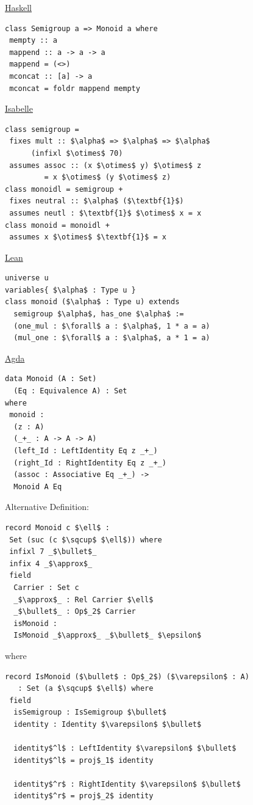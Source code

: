 \documentclass{beamer}
\begin{document}
\begin{frame}[fragile,t]
\begin{multicols}{3}
\begin{minipage}{2.9in}
\underline{Haskell}
\begin{lstlisting}
class Semigroup a => Monoid a where 
 mempty :: a 
 mappend :: a -> a -> a 
 mappend = (<>) 
 mconcat :: [a] -> a 
 mconcat = foldr mappend mempty
\end{lstlisting}
\underline{Isabelle}
\begin{lstlisting}
class semigroup = 
 fixes mult :: $\alpha$ => $\alpha$ => $\alpha$
      (infixl $\otimes$ 70) 
 assumes assoc :: (x $\otimes$ y) $\otimes$ z
         = x $\otimes$ (y $\otimes$ z)
class monoidl = semigroup + 
 fixes neutral :: $\alpha$ ($\textbf{1}$)
 assumes neutl : $\textbf{1}$ $\otimes$ x = x 
class monoid = monoidl + 
 assumes x $\otimes$ $\textbf{1}$ = x
\end{lstlisting}
\underline{Lean}
\begin{lstlisting}
universe u 
variables{ $\alpha$ : Type u }
class monoid ($\alpha$ : Type u) extends
  semigroup $\alpha$, has_one $\alpha$ := 
  (one_mul : $\forall$ a : $\alpha$, 1 * a = a)
  (mul_one : $\forall$ a : $\alpha$, a * 1 = a)
\end{lstlisting}
        \end{minipage} 
        \begin{minipage}{3in}
\underline{Agda}
\begin{lstlisting}
data Monoid (A : Set) 
  (Eq : Equivalence A) : Set 
where 
 monoid : 
  (z : A)
  (_+_ : A -> A -> A)
  (left_Id : LeftIdentity Eq z _+_)
  (right_Id : RightIdentity Eq z _+_)  
  (assoc : Associative Eq _+_) -> 
  Monoid A Eq 
\end{lstlisting}
Alternative Definition: 
\begin{lstlisting}
record Monoid c $\ell$ : 
 Set (suc (c $\sqcup$ $\ell$)) where 
 infixl 7 _$\bullet$_ 
 infix 4 _$\approx$_ 
 field 
  Carrier : Set c 
  _$\approx$_ : Rel Carrier $\ell$ 
  _$\bullet$_ : Op$_2$ Carrier 
  isMonoid : 
  IsMonoid _$\approx$_ _$\bullet$_ $\epsilon$ 
\end{lstlisting}
where
\begin{lstlisting}
record IsMonoid ($\bullet$ : Op$_2$) ($\varepsilon$ : A) 
   : Set (a $\sqcup$ $\ell$) where 
 field 
  isSemigroup : IsSemigroup $\bullet$ 
  identity : Identity $\varepsilon$ $\bullet$ 
       
  identity$^l$ : LeftIdentity $\varepsilon$ $\bullet$ 
  identity$^l$ = proj$_1$ identity 
        
  identity$^r$ : RightIdentity $\varepsilon$ $\bullet$ 
  identity$^r$ = proj$_2$ identity 
\end{lstlisting}
       \end{minipage}
  \end{multicols} 
\end{frame}
\end{document}
